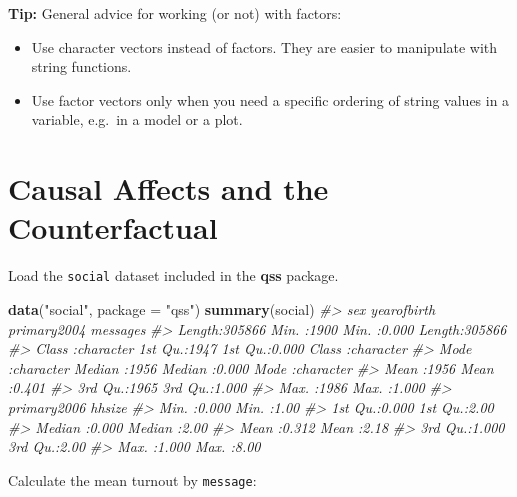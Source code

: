 \documentclass[]{book}
\newenvironment{Shaded}{\begin{snugshade}}{\end{snugshade}}
\newcommand{\CommentTok}[1]{\textcolor[rgb]{0.56,0.35,0.01}{\textit{#1}}}
\newcommand{\DataTypeTok}[1]{\textcolor[rgb]{0.13,0.29,0.53}{#1}}
\newcommand{\KeywordTok}[1]{\textcolor[rgb]{0.13,0.29,0.53}{\textbf{#1}}}
\newcommand{\NormalTok}[1]{#1}
\newcommand{\OperatorTok}[1]{\textcolor[rgb]{0.81,0.36,0.00}{\textbf{#1}}}
\newcommand{\StringTok}[1]{\textcolor[rgb]{0.31,0.60,0.02}{#1}}
\providecommand{\tightlist}{%
  \setlength{\itemsep}{0pt}\setlength{\parskip}{0pt}}
\theoremstyle{definition}
\theoremstyle{definition}
\theoremstyle{definition}
\theoremstyle{remark}
\begin{document}
\textbf{Tip:} General advice for working (or not) with factors:

\begin{itemize}
\tightlist
\item
  Use character vectors instead of factors. They are easier to
  manipulate with string functions.
\item
  Use factor vectors only when you need a specific ordering of string
  values in a variable, e.g.~in a model or a plot.
\end{itemize}

\hypertarget{causal-affects-and-the-counterfactual}{%
\section{Causal Affects and the
Counterfactual}\label{causal-affects-and-the-counterfactual}}

Load the \texttt{social} dataset included in the \textbf{qss} package.

\begin{Shaded}
\begin{Highlighting}[]
\KeywordTok{data}\NormalTok{(}\StringTok{"social"}\NormalTok{, }\DataTypeTok{package =} \StringTok{"qss"}\NormalTok{)}
\KeywordTok{summary}\NormalTok{(social)}
\CommentTok{#>      sex             yearofbirth    primary2004      messages        }
\CommentTok{#>  Length:305866      Min.   :1900   Min.   :0.000   Length:305866     }
\CommentTok{#>  Class :character   1st Qu.:1947   1st Qu.:0.000   Class :character  }
\CommentTok{#>  Mode  :character   Median :1956   Median :0.000   Mode  :character  }
\CommentTok{#>                     Mean   :1956   Mean   :0.401                     }
\CommentTok{#>                     3rd Qu.:1965   3rd Qu.:1.000                     }
\CommentTok{#>                     Max.   :1986   Max.   :1.000                     }
\CommentTok{#>   primary2006        hhsize    }
\CommentTok{#>  Min.   :0.000   Min.   :1.00  }
\CommentTok{#>  1st Qu.:0.000   1st Qu.:2.00  }
\CommentTok{#>  Median :0.000   Median :2.00  }
\CommentTok{#>  Mean   :0.312   Mean   :2.18  }
\CommentTok{#>  3rd Qu.:1.000   3rd Qu.:2.00  }
\CommentTok{#>  Max.   :1.000   Max.   :8.00}
\end{Highlighting}
\end{Shaded}

Calculate the mean turnout by \texttt{message}:

\begin{Shaded}
\end{Shaded}
\end{document}
